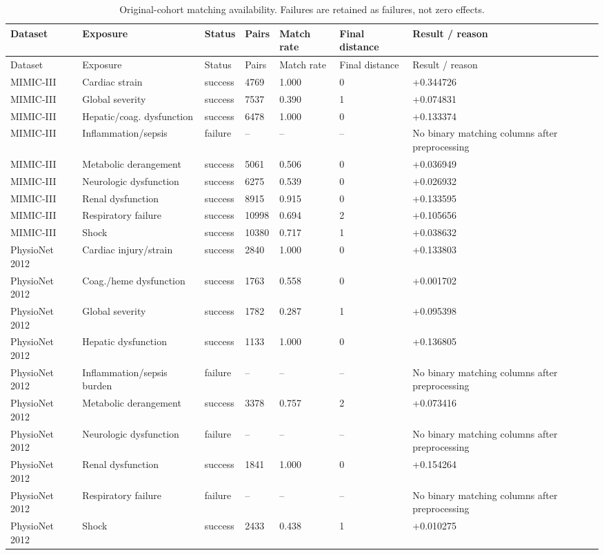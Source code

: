\begin{longtable}{@{}p{0.78in}p{1.10in}p{0.44in}p{0.48in}p{0.54in}p{0.48in}p{1.02in}@{}}
\caption{Original-cohort matching availability. Failures are retained as failures, not zero effects.}\label{tab:supp-matching}\\
\toprule Dataset & Exposure & Status & Pairs & Match rate & Final distance & Result / reason\\
\midrule \endfirsthead
\toprule Dataset & Exposure & Status & Pairs & Match rate & Final distance & Result / reason\\
\midrule \endhead
MIMIC-III & Cardiac strain & success & 4769 & 1.000 & 0 & +0.344726\\
MIMIC-III & Global severity & success & 7537 & 0.390 & 1 & +0.074831\\
MIMIC-III & Hepatic/coag. dysfunction & success & 6478 & 1.000 & 0 & +0.133374\\
MIMIC-III & Inflammation/sepsis & failure & -- & -- & -- & No binary matching columns after preprocessing\\
MIMIC-III & Metabolic derangement & success & 5061 & 0.506 & 0 & +0.036949\\
MIMIC-III & Neurologic dysfunction & success & 6275 & 0.539 & 0 & +0.026932\\
MIMIC-III & Renal dysfunction & success & 8915 & 0.915 & 0 & +0.133595\\
MIMIC-III & Respiratory failure & success & 10998 & 0.694 & 2 & +0.105656\\
MIMIC-III & Shock & success & 10380 & 0.717 & 1 & +0.038632\\
PhysioNet 2012 & Cardiac injury/strain & success & 2840 & 1.000 & 0 & +0.133803\\
PhysioNet 2012 & Coag./heme dysfunction & success & 1763 & 0.558 & 0 & +0.001702\\
PhysioNet 2012 & Global severity & success & 1782 & 0.287 & 1 & +0.095398\\
PhysioNet 2012 & Hepatic dysfunction & success & 1133 & 1.000 & 0 & +0.136805\\
PhysioNet 2012 & Inflammation/sepsis burden & failure & -- & -- & -- & No binary matching columns after preprocessing\\
PhysioNet 2012 & Metabolic derangement & success & 3378 & 0.757 & 2 & +0.073416\\
PhysioNet 2012 & Neurologic dysfunction & failure & -- & -- & -- & No binary matching columns after preprocessing\\
PhysioNet 2012 & Renal dysfunction & success & 1841 & 1.000 & 0 & +0.154264\\
PhysioNet 2012 & Respiratory failure & failure & -- & -- & -- & No binary matching columns after preprocessing\\
PhysioNet 2012 & Shock & success & 2433 & 0.438 & 1 & +0.010275\\
\bottomrule \end{longtable}
